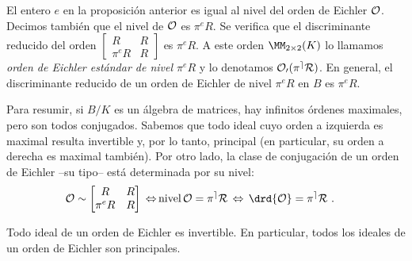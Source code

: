 El entero $e$ en la proposici\'{o}n anterior es igual al nivel del orden
de Eichler $\cal{O}$. Decimos tambi\'{e}n que el nivel de $\cal{O}$ es
$\pi^{e}R$. Se verifica que el discriminante reducido del orden
$\begin{bmatrix} R & R \\ \pi^{e}R & R \end{bmatrix}$ es $\pi^{e}R$.
A este orden $\MM_{2\times 2}(K)$ lo llamamos
\emph{orden de Eichler est\'{a}ndar de nivel $\pi^{e}R$} y lo denotamos
$\cal{O}_{0}(\pi^{e}R)$. En general, el discriminante reducido de un orden
de Eichler de nivel $\pi^{e}R$ en $B$ es $\pi^{e}R$.

Para resumir, si $B/K$ es un \'{a}lgebra de matrices, hay infinitos
\'{o}rdenes maximales, pero son todos conjugados. Sabemos que todo ideal
cuyo orden a izquierda es maximal resulta invertible y, por lo tanto, principal
(en particular, su orden a derecha es maximal tambi\'{e}n). Por otro lado,
la clase de conjugaci\'{o}n de un orden de Eichler --su tipo-- est\'{a}
determinada por su nivel:
\begin{align*}
 \cal{O}\sim\begin{bmatrix} R & R \\ \pi^{e}R & R \end{bmatrix}
	\,\Leftrightarrow\, &
 \text{nivel}\,\cal{O}=\pi^{e}R\,\Leftrightarrow\,
	\drd{\cal{O}}=\pi^{e}R
	\text{ .}
\end{align*}
%

\begin{propoEichlerInvertible}
 Todo ideal de un orden de Eichler es invertible.
 En particular, todos los ideales de un orden de Eichler son principales.
\end{propoEichlerInvertible}


